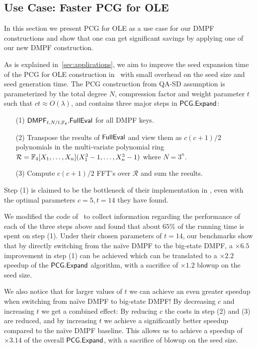 \subsection{Use Case: Faster PCG for OLE}\label{sec:impl_pcg}
In this section we present PCG for OLE as a use case for our DMPF constructions and show that one can get significant savings by applying one of our new DMPF construction. 

As is explained in~\cref{sec:applications}, we aim to improve the seed expansion time of the PCG for OLE construction in~\cite{foleage} with small overhead on the seed size and seed generation time. The PCG construction from QA-SD assumption is parameterized by the total degree $N$, compression factor and weight parameter $t$ such that $ct\approx O(\lambda)$, and contains three major steps in ${\sf PCG}.{\sf Expand}$: 

\begin{itemize}
    \item[(1)]${\sf DMPF}_{t, N/t, \mathbb{F}_4}.{\sf FullEval}$ for all DMPF keys. 
    \item[(2)]Transpose the results of ${\sf FullEval}$ and view them as $c(c+1)/2$ polynomials in the multi-variate polynomial ring $\mathcal{R} = \mathbb{F}_4[X_1,\dots,X_n](X_1^3-1,\dots,X_n^3-1)$ where $N=3^n$.
    \item[(3)]Compute $c(c+1)/2$ FFT's over $\mathcal{R}$ and sum the results.
\end{itemize}
Step (1) is claimed to be the bottleneck of their implementation in \cite{foleage}, even with the optimal parameters $c=5,t=14$ they have found.

We modified the code of~\cite{foleage} to collect information regarding the performance of each of the three steps above and found that about $65\%$ of the running time is spent on step (1).
Under their chosen parameters of $t=14$, our benchmarks show that by directly switching from the na\"ive DMPF to the big-state DMPF, a $\times 6.5$ improvement in step (1) can be achieved which can be translated to a $\times 2.2$ speedup of the ${\sf PCG.Expand}$ algorithm, with a sacrifice of $\times 1.2$ blowup on the seed size.

We also notice that for larger values of $t$ we can achieve an even greater speedup when switching from na\"ive DMPF to big-state DMPF! 
By decreasing $c$ and increasing $t$ we get a combined effect: By reducing $c$ the costs in step (2) and (3)  are reduced, and by increasing $t$ we achieve a significantly better speedup compared to the na\"ive DMPF baseline.
This allows us to achieve a speedup of $\times 3.14$ of the overall ${\sf PCG.Expand}$, with a sacrifice of  blowup on the seed size.

